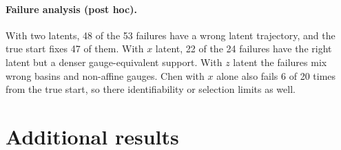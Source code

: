 \paragraph{Failure analysis (post hoc).} With two latents, 48 of the 53 failures have a wrong latent trajectory, and the true start fixes 47 of them. With $x$ latent, 22 of the 24 failures have the right latent but a denser gauge-equivalent support. With $z$ latent the failures mix wrong basins and non-affine gauges. Chen with $x$ alone also fails 6 of 20 times from the true start, so there identifiability or selection limits as well.

\begin{table}[t]
\centering
\caption{Partial observation, pre-registered test (exact recovery up to an affine latent gauge; 60 pairs per configuration, 20 per system). Columns give the latent components. \emph{Strict}: exact and no more terms than the true model. Time: median seconds per run on one core of a shared machine. The oracle-start arm uses the true latent and is a diagnostic only.}
\label{tab:partial}
\small
{}
\end{table}

\section{Additional results}
\label{app:more}

